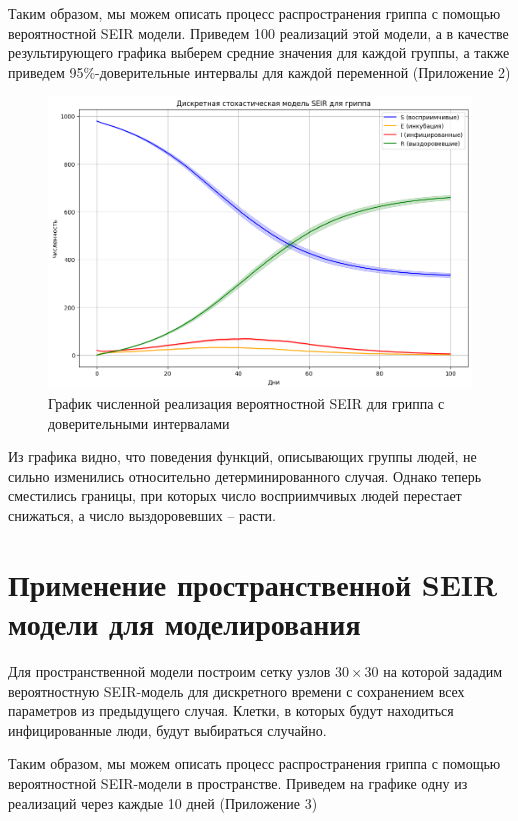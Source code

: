 \documentclass[a4paper, 14pt]{extreport}
\begin{document}
	Таким образом, мы можем описать процесс распространения гриппа с помощью вероятностной SEIR модели. Приведем 100 реализаций этой модели, а в качестве результирующего графика выберем средние значения для каждой группы, а также приведем 95\%-доверительные интервалы для каждой переменной (Приложение 2)
	
	\begin{figure}[h]
		\centering
		\includegraphics[scale=0.5]{images/graph02}
		\caption{График численной реализация вероятностной SEIR для гриппа с доверительными интервалами}
		\label{fig:graph02}
	\end{figure}
	
	Из графика видно, что поведения функций, описывающих группы людей, не сильно изменились относительно детерминированного случая. Однако теперь сместились границы, при которых число восприимчивых людей перестает снижаться, а число выздоровевших -- расти. 
	
	\section{Применение пространственной SEIR модели для моделирования}
	Для пространственной модели построим сетку узлов $30 \times 30$ на которой зададим вероятностную SEIR-модель для дискретного времени с сохранением всех параметров из предыдущего случая. Клетки, в которых будут находиться инфицированные люди, будут выбираться случайно.
	
	Таким образом, мы можем описать процесс распространения гриппа с помощью вероятностной SEIR-модели в пространстве. Приведем на графике одну из реализаций через каждые 10 дней (Приложение 3)
	
\end{document}
